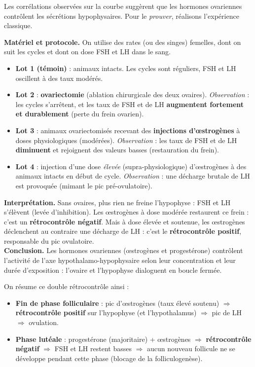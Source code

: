 \documentclass[11pt]{article}
\begin{document}
Les corrélations observées sur la courbe suggèrent que les hormones ovariennes contrôlent les sécrétions hypophysaires. Pour le \emph{prouver}, réalisons l'expérience classique.

\begin{experience}
\textbf{Matériel et protocole.} On utilise des rates (ou des singes) femelles, dont on suit les cycles et dont on dose FSH et LH dans le sang.
\begin{itemize}
  \item \textbf{Lot 1 (témoin)} : animaux intacts. Les cycles sont réguliers, FSH et LH oscillent à des taux modérés.
  \item \textbf{Lot 2} : \textbf{ovariectomie} (ablation chirurgicale des deux ovaires). \emph{Observation} : les cycles s'arrêtent, et les taux de FSH et de LH \textbf{augmentent fortement et durablement} (perte du frein ovarien).
  \item \textbf{Lot 3} : animaux ovariectomisés recevant des \textbf{injections d'œstrogènes} à doses physiologiques (modérées). \emph{Observation} : les taux de FSH et de LH \textbf{diminuent} et rejoignent des valeurs basses (restauration du frein).
  \item \textbf{Lot 4} : injection d'une dose \emph{élevée} (supra-physiologique) d'œstrogènes à des animaux intacts en début de cycle. \emph{Observation} : une décharge brutale de LH est provoquée (mimant le pic pré-ovulatoire).
\end{itemize}
\textbf{Interprétation.} Sans ovaires, plus rien ne freine l'hypophyse : FSH et LH s'élèvent (levée d'inhibition). Les œstrogènes à dose modérée restaurent ce frein : c'est un \textbf{rétrocontrôle négatif}. Mais à dose élevée et soutenue, les œstrogènes déclenchent au contraire une décharge de LH : c'est le \textbf{rétrocontrôle positif}, responsable du pic ovulatoire.\\
\textbf{Conclusion.} Les hormones ovariennes (œstrogènes et progestérone) contrôlent l'activité de l'axe hypothalamo-hypophysaire selon leur concentration et leur durée d'exposition : l'ovaire et l'hypophyse dialoguent en boucle fermée.
\end{experience}

On résume ce double rétrocontrôle ainsi :
\begin{itemize}
  \item \textbf{Fin de phase folliculaire} : pic d'œstrogènes (taux élevé soutenu) $\Rightarrow$ \textbf{rétrocontrôle positif} sur l'hypophyse (et l'hypothalamus) $\Rightarrow$ pic de LH $\Rightarrow$ ovulation.
  \item \textbf{Phase lutéale} : progestérone (majoritaire) + œstrogènes $\Rightarrow$ \textbf{rétrocontrôle négatif} $\Rightarrow$ FSH et LH restent basses $\Rightarrow$ aucun nouveau follicule ne se développe pendant cette phase (blocage de la folliculogenèse).
\end{itemize}
\end{document}
